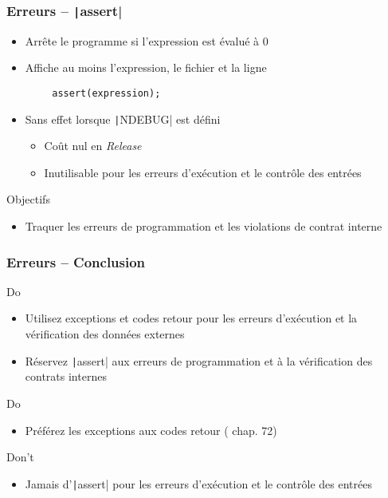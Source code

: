 \documentclass[C++.tex]{subfiles}
\begin{document}
\begin{frame}[fragile]
	\frametitle{Erreurs -- \texttt|assert|}
	\begin{itemize}
		\item Arrête le programme si l'expression est évalué à 0
		\item Affiche au moins l'expression, le fichier et la ligne
	\end{itemize}

	\begin{verbatim}
		assert(expression);
	\end{verbatim}

	\begin{itemize}
		\item Sans effet lorsque \texttt|NDEBUG| est défini
		\begin{itemize}
			\item Coût nul en \textit{Release}
			\item Inutilisable pour les erreurs d'exécution et le contrôle des entrées
		\end{itemize}
	\end{itemize}

	\begin{block}{Objectifs}
		\begin{itemize}
			\item Traquer les erreurs de programmation et les violations de contrat interne
		\end{itemize}
	\end{block}
\end{frame}

\begin{frame}[fragile]
	\frametitle{Erreurs -- Conclusion}
	\begin{exampleblock}{Do}
		\begin{itemize}
			\item Utilisez exceptions et codes retour pour les erreurs d'exécution et la vérification des données externes
			\item Réservez \texttt|assert| aux erreurs de programmation et à la vérification des contrats internes
		\end{itemize}
	\end{exampleblock}

	\begin{exampleblock}{Do}
		\begin{itemize}
			\item Préférez les exceptions aux codes retour (\cite{coding} chap. 72)
		\end{itemize}
	\end{exampleblock}

	\begin{alertblock}{Don't}
		\begin{itemize}
			\item Jamais d'\texttt|assert| pour les erreurs d'exécution et le contrôle des entrées
		\end{itemize}
	\end{alertblock}
\end{frame}
\end{document}
